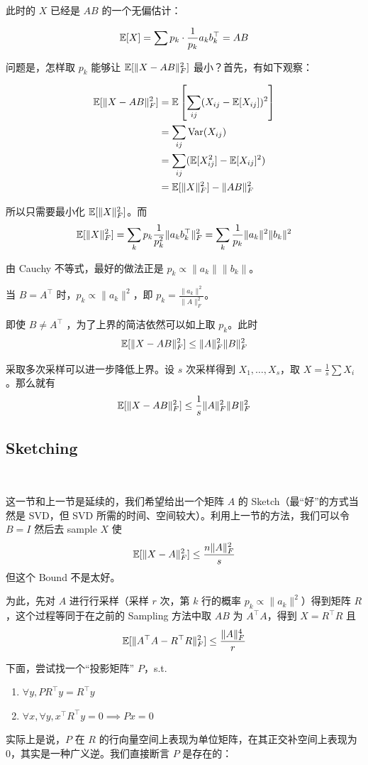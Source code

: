 此时的 $X$ 已经是 $AB$ 的一个无偏估计：

\[
    \mathbb{E}[X] = \sum p_{k} \cdot \frac{1}{p_{k}}a_{k}b_{k}^\top = AB
\]

问题是，怎样取 $p_k$ 能够让 $\mathbb{E}[\|X-AB\|_{F}^{2}]$ 最小？首先，有如下观察：

\begin{align*}
    \mathbb{E}[\|X-AB\|_{F}^{2}] &= \mathbb{E}\left[\sum_{ij}(X_{ij}-\mathbb{E}[X_{ij}])^{2}\right] \\
    &= \sum_{ij}\text{Var}(X_{ij}) \\
    &= \sum_{ij}(\mathbb{E}[X_{ij}^{2}]-\mathbb{E}[X_{ij}]^{2}) \\
    &= \mathbb{E}[\|X\|_{F}^{2}] - \|AB\|_{F}^{2}
\end{align*}

所以只需要最小化 $\mathbb{E}[\|X\|_{F}^{2}]$。而
\[
    \mathbb{E}[\|X\|_{F}^{2}] = \sum_{k} p_{k} \frac{1}{p_{k}^{2}} \|a_{k}b_{k}^\top\|_{F}^{2} = \sum_{k} \frac{1}{p_{k}} \|a_{k}\|^{2} \|b_{k}\|^{2}
\]

由 Cauchy 不等式，最好的做法正是 $p_{k} \propto \|a_{k}\| \|b_{k}\|$。

当 $B=A^\top$ 时，$p_{k} \propto \|a_{k}\|^{2}$，即 $p_{k} = \frac{\|a_{k}\|^{2}}{\|A\|_{F}^{2}}$。

即使 $B \ne A^\top$ ，为了上界的简洁依然可以如上取 $p_k$。此时
\[
    \mathbb{E}[\|X-AB\|_{F}^{2}] \le \|A\|_{F}^{2}\|B\|_{F}^{2}
\]

采取多次采样可以进一步降低上界。设 $s$ 次采样得到 $X_{1}, \dots, X_{s}$，取 $X=\frac{1}{s}\sum X_{i}$。那么就有
\[
    \mathbb{E}[\|X-AB\|_{F}^{2}] \le \frac{1}{s}\|A\|_{F}^{2}\|B\|_{F}^{2}
\]

\subsection{Sketching} ~

这一节和上一节是延续的，我们希望给出一个矩阵 $A$ 的 Sketch（最``好''的方式当然是 SVD，但 SVD 所需的时间、空间较大）。利用上一节的方法，我们可以令 $B=I$ 然后去 sample $X$ 使 
\[
    \mathbb{E}[\|X-A\|_{F}^{2}] \le \frac{n\|A\|_{F}^{2}}{s}
\]
但这个 Bound 不是太好。

为此，先对 $A$ 进行行采样（采样 $r$ 次，第 $k$ 行的概率 $p_k \propto \|a_{k}\|^{2}$）得到矩阵 $R$，这个过程等同于在之前的 Sampling 方法中取 $AB$ 为 $A^\top A$，得到 $X=R^\top R$ 且
\[
    \mathbb{E}[\|A^{\top}A-R^{\top}R\|_{F}^{2}] \le \frac{\|A\|_{F}^{4}}{r}
\]

下面，尝试找一个``投影矩阵'' $P$，s.t.
\begin{enumerate}[noitemsep]
    \item $\forall y, PR^{\top}y=R^{\top}y$
    \item $\forall x, \forall y, x^{\top}R^{\top}y=0 \implies Px=0$
\end{enumerate}
实际上是说，$P$ 在 $R$ 的行向量空间上表现为单位矩阵，在其正交补空间上表现为 0，其实是一种广义逆。我们直接断言 $P$ 是存在的：

